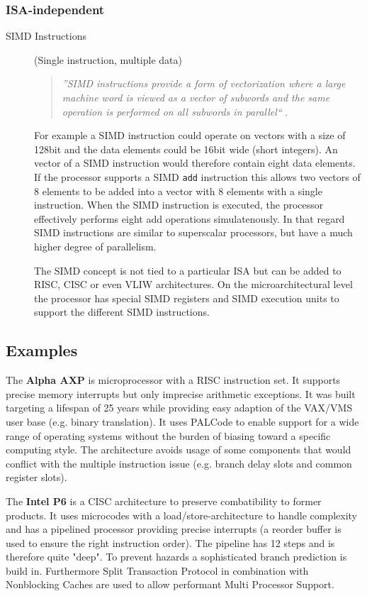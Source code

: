 \documentclass[a4paper,10pt]{article}
\begin{document}
\subsubsection{ISA-independent}
\begin{description}
\item[SIMD Instructions] (Single instruction, multiple data)
\begin{quote}
    \textit{''SIMD instructions provide a form of vectorization where a large machine word is viewed as a vector of subwords and the same
    operation is performed on all subwords in parallel``} \cite{simd}.
\end{quote}
For example a SIMD instruction could operate on vectors with a size of 128bit and the data elements could be 16bit wide (short integers).
An vector of a SIMD instruction would therefore contain eight data elements. If the processor supports a SIMD \lstinline{add} instruction
this allows two vectors of 8 elements to be added into a vector with 8 elements with a single instruction. When the SIMD instruction is
executed, the processor effectively performs eight add operations simulatenously. In that regard SIMD instructions are similar to
superscalar processors, but have a much higher degree of parallelism.

The SIMD concept is not tied to a particular ISA but can be added to RISC, CISC or even VLIW architectures. On the microarchitectural
level the processor has special SIMD registers and SIMD execution units to support the different SIMD instructions.
\end{description}


\subsection{Examples}
The \textbf{Alpha AXP} is microprocessor with a RISC instruction set. It supports precise memory interrupts but only imprecise arithmetic exceptions. It was built targeting a lifespan of 25 years while providing easy adaption of the VAX/VMS user base (e.g. binary translation). It uses PALCode to enable support for a wide range of operating systems without the burden of biasing toward a specific computing style. The architecture avoids usage of some components that would conflict with the multiple instruction issue (e.g. branch delay slots and common register slots).

The \textbf{Intel P6} is a CISC architecture to preserve combatibility to former products. It uses microcodes with a load/store-architecture to handle complexity and has a pipelined processor providing precise interrupts (a reorder buffer is used to ensure the right instruction order). The pipeline has 12 steps and is therefore quite "deep". To prevent hazards a sophisticated branch prediction is build in. Furthermore Split Transaction Protocol in combination with Nonblocking Caches are used to allow performant Multi Processor Support.
\end{document}
